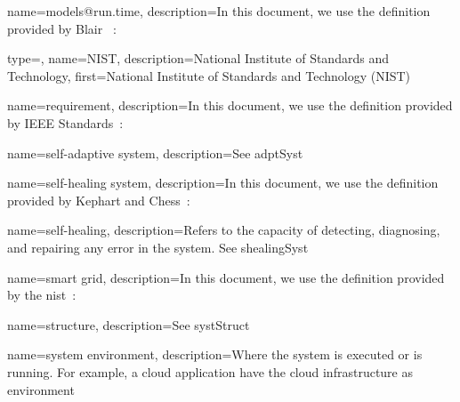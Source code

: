 {
	name={models@run.time},
	description={In this document, we use the definition provided by Blair \etal~\cite{DBLP:journals/computer/BlairBF09}: }
}

{
	type=\acronymtype,
	name={NIST},
	description={National Institute of Standards and Technology},
	first={National Institute of Standards and Technology (NIST)}
}


{
	name={requirement},
	description={In this document, we use the definition provided by IEEE Standards~\cite{iso2017systems}: }
}

{
	name={self-adaptive system},
	description={See \gls{adptSyst}}
}

{
	name={self-healing system},
	description={In this document, we use the definition provided by Kephart and Chess~\cite{DBLP:journals/computer/KephartC03}: }
}

{
	name={self-healing},
	description={Refers to the capacity of detecting, diagnosing, and repairing any error in the system. See \gls{shealingSyst}}
}

{
	name={smart grid},
	description={In this document, we use the definition provided by the \gls{nist}~\cite{NIST:SmartGrid:Def:What}: }
}

{
	name={structure},
	description={See \gls{systStruct}}
}

{
	name={system environment},
	description={Where the system is executed or is running. For example, a cloud application have the cloud infrastructure as environment}
}

